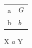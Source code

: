 \documentclass{article}
\def\C{}\def\D{}
\begin{document}
\begin{tabular}{ll}
  a & $\StrFindGroup{{\ensuremath{G}}{h}}{1}[\C]\StrExpand[2]{\C}{\D}\D$ \\
  b & $b$ \\
\end{tabular}

\MakeUppercase{x \ensuremath{a} y}
\end{document}
